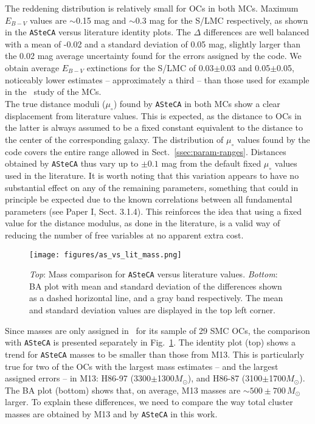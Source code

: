 \documentclass{aa}
\begin{document}
The reddening distribution is relatively small for OCs in both MCs. Maximum
$E_{B-V}$ values are $\sim$0.15 mag and $\sim$0.3 mag for the S/LMC
respectively, as shown in the \texttt{ASteCA} versus literature identity plots.
The $\Delta$ differences are well balanced with a mean of -0.02 and a
standard deviation of 0.05 mag, slightly larger than the 0.02 mag average
uncertainty found for the errors assigned by the code. We obtain average
$E_{B-V}$ extinctions for the S/LMC of 0.03$\pm$0.03 and 0.05$\pm$0.05,
noticeably lower estimates -- approximately a third -- than those used for
example in the~\cite{Hunter_2003} study of the MCs.\\

The true distance moduli ($\mu_{\circ}$) found by \texttt{ASteCA} in both MCs
show a clear displacement from literature values. This is expected, as the
distance to OCs in the latter is always assumed to be a fixed constant
equivalent to the
distance to the center of the corresponding galaxy.
The distribution of $\mu_{\circ}$ values found by the code covers the entire
range allowed in Sect.~\ref{ssec:param-ranges}. Distances obtained by \texttt
{ASteCA} thus vary up to ${\pm}0.1$ mag from the default fixed $\mu_{\circ}$
values used in the literature.
%
It is worth noting that this variation appears to have no substantial effect on
any of the remaining parameters, something that could in principle be expected
due to the known correlations between all fundamental parameters (see Paper I,
Sect. 3.1.4).
This reinforces the idea that using a fixed value for the distance modulus, as
done in the literature, is a valid way of reducing the number of free variables
at no apparent extra cost.\\

\begin{figure}
\centering
\texttt{[image: figures/as\_vs\_lit\_mass.png]}
\caption{\emph{Top}: Mass comparison for \texttt{ASteCA} versus literature
values.
\emph{Bottom}: BA plot with mean and standard deviation of the differences
shown as a dashed horizontal line, and a gray band respectively. The mean and
standard deviation values are displayed in the top left corner.}
\label{fig:as_vs_lit_mass}
\end{figure}

Since masses are only assigned in~\citet[][M13]{Maia_2013} for its sample of 29
SMC OCs, the comparison with \texttt{ASteCA} is presented separately in
Fig.~\ref{fig:as_vs_lit_mass}.
%
The identity plot (top) shows a trend for \texttt{ASteCA} masses to be smaller
than those from M13. This is particularly true for two of the OCs with
the largest mass estimates -- and the largest assigned errors -- in M13:
H86-97 (3300$\pm$1300$M_{\odot}$), and H86-87
(3100$\pm$1700$M_{\odot}$). The BA plot (bottom) shows that, on average, M13
masses are ${\sim}500{\pm}700\,M_{\odot}$ larger.
%
To explain these differences, we need to compare the way total cluster masses
are obtained by M13 and by \texttt{ASteCA} in this work.
\end{document}
